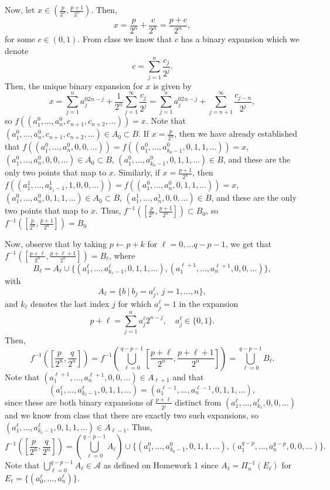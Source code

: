 \documentclass{article}
\begin{document}
Now, let $x\in\left(\frac{p}{2^n},\frac{p+1}{2^n}\right)$. Then,
\[
x=\frac{p}{2^n}+\frac{c}{2^n}=\frac{p+c}{2^n},
\]
for some $c\in(0,1)$. From class we know that $c$ has a binary expansion which we denote
\[
c=\sum_{j=1}^n\frac{c_j}{2^j}.
\]
Then, the unique binary expansion for $x$ is given by
\[
x=\sum_{j=1}^na_j^02^{n-j}+\frac{1}{2^n}\sum_{j=1}^\infty\frac{c_j}{2^j}=\sum_{j=1}^na_j^02^{n-j}+\sum_{j=n+1}^\infty\frac{c_{j-n}}{2^j},
\]
so $f\left((a_1^0,\ldots,a_n^0,c_{n+1},c_{n+2},\ldots)\right)=x$. Note that $(a_1^0,\ldots,a_n^0,c_{n+1},c_{n+2},\ldots)\in A_0\subset B$. If $x=\frac{p}{2^n}$, then we have already established that $f\left((a_1^0,\ldots,a_n^0,0,0,\ldots)\right)=f\left((a_1^0,\ldots,a_{k_0-1}^0,0,1,1,\ldots)\right)=x$,  $(a_1^0,\ldots,a_n^0,0,0,\ldots)\in A_0\subset B$, $(a_1^0,\ldots,a_{k_0-1}^0,0,1,1,\ldots)\in B$, and these are the only two points that map to $x$. Similarly, if $x=\frac{p+1}{2^n}$, then $f\left((a_1^1,\ldots,a_{ k_1-1}^1,1,0,0,\ldots)\right)=f\left((a_1^0,\ldots,a_{n}^0,0,1,1,\ldots)\right)=x$,  $(a_1^0,\ldots,a_{n}^0,0,1,1,\ldots)\in A_0\subset B$, $(a_1^1,\ldots,a_{n}^1,0,0,\ldots)\in B$, and these are the only two points that map to $x$. Thus, $f^{-1}\left(\left[\frac{p}{2^n},\frac{p+1}{2^n}\right]\right)\subset B_0$, so $f^{-1}\left(\left[\frac{p}{2^n},\frac{p+1}{2^n}\right]\right)=B_0$

Now, observe that by taking $p\leftarrow p+k$ for $\ell=0,\ldots q-p-1$, we get that $f^{-1}\left(\left[\frac{p+\ell}{2^n},\frac{p+\ell+1}{2^n}\right]\right)=B_\ell$, where
\[
B_\ell=A_\ell\cup\{(a_1^\ell,\ldots,a^\ell_{k_\ell-1},0,1,1,\ldots),(a^{\ell+1}_1,\ldots,a^{\ell+1}_n,0,0,\ldots)\},
\]
with
\[
A_\ell=\{b~|~b_j=a^\ell_j,~j=1,\ldots,n\},
\]
and $k_\ell$ denotes the last index $j$ for which $a_{j}^\ell=1$ in the expansion
\[
p+\ell=\sum_{j=1}^na_j^\ell2^{n-j},\quad a^\ell_j\in\{0,1\}.
\]
Then, 
\[
f^{-1}\left(\left[\frac{p}{2^n},\frac{q}{2^n}\right]\right)=f^{-1}\left(\bigcup_{\ell=0}^{q-p-1}\left[\frac{p+\ell}{2^n},\frac{p+\ell+1}{2^n}\right]\right)=\bigcup_{\ell=0}^{q-p-1}B_\ell.
\]
Note that $(a^{\ell+1}_1,\ldots,a^{\ell+1}_n,0,0,\ldots)\in A_{\ell+1}$ and that
\[
(a_1^\ell,\ldots,a^\ell_{k_\ell-1},0,1,1,\ldots)=(a_1^{\ell-1},\ldots,a^{\ell-1}_{n},0,1,1,\ldots),
\]
since these are both binary expansions of $\frac{p+\ell}{2^j}$ distinct from $(a_1^\ell,\ldots,a^\ell_{k_\ell},0,0,\ldots)$ and we know from class that there are exactly two such expansions, so $(a_1^\ell,\ldots,a^\ell_{k_\ell-1},0,1,1,\ldots)\in A_{\ell-1}$. Thus,
\[
f^{-1}\left(\left[\frac{p}{2^n},\frac{q}{2^n}\right]\right)=\left(\bigcup_{\ell=0}^{q-p-1}A_\ell\right)\cup\{(a_1^0,\ldots,a^0_{k_0-1},0,1,1,\ldots),(a^{q-p}_1,\ldots,a^{q-p}_n,0,0,\ldots)\}.
\]
Note that $\bigcup_{\ell=0}^{q-p-1}A_\ell\in\mathcal{A}$ as defined on Homework 1 since $A_\ell=\Pi^{-1}_n(E_\ell)$ for $E_\ell=\{(a_0^\ell,\ldots,a_n^\ell)\}$.
\end{document}

